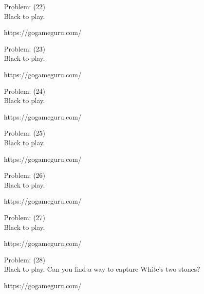 \documentclass[11pt]{article}
\begin{document}
\begin{minipage}[t]{0.5\textwidth}
  {\centering
  
  Problem: (22)\\
  Black to play.

https://gogameguru.com/\\
  }
\end{minipage}
\begin{minipage}[t]{0.5\textwidth}
  {\centering
  
  Problem: (23)\\
  Black to play.

https://gogameguru.com/\\
  }
\end{minipage}
\begin{minipage}[t]{0.5\textwidth}
  {\centering
  
  Problem: (24)\\
  Black to play.

https://gogameguru.com/\\
  }
\end{minipage}
\begin{minipage}[t]{0.5\textwidth}
  {\centering
  
  Problem: (25)\\
  Black to play.

https://gogameguru.com/\\
  }
\end{minipage}
\begin{minipage}[t]{0.5\textwidth}
  {\centering
  
  Problem: (26)\\
  Black to play.

https://gogameguru.com/\\
  }
\end{minipage}
\begin{minipage}[t]{0.5\textwidth}
  {\centering
  
  Problem: (27)\\
  Black to play.

https://gogameguru.com/\\
  }
\end{minipage}
\begin{minipage}[t]{0.5\textwidth}
  {\centering
  
  Problem: (28)\\
  Black to play. Can you find a way to capture White's two stones?

https://gogameguru.com/\\
  }
\end{minipage}
\end{document}
